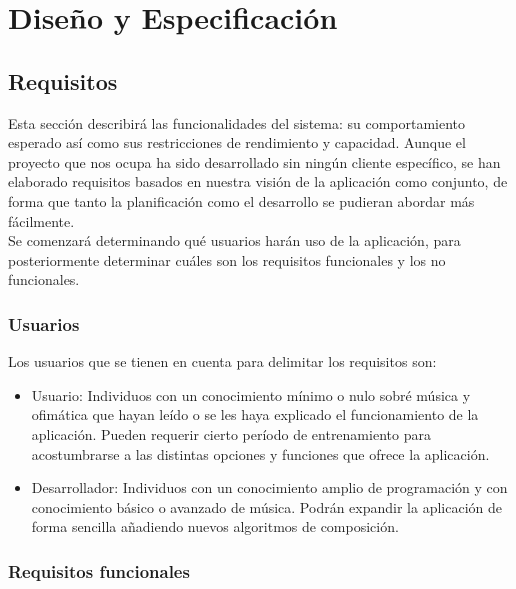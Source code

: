 \chapter{Diseño y Especificación}


\section{Requisitos}
	Esta sección describirá las funcionalidades del sistema: su comportamiento esperado así como sus restricciones de rendimiento y capacidad. Aunque el proyecto que nos ocupa ha sido desarrollado sin ningún cliente específico, se han elaborado requisitos basados en nuestra visión de la aplicación como conjunto, de forma que tanto la planificación como el desarrollo se pudieran abordar más fácilmente.\\
	
	Se comenzará determinando qué usuarios harán uso de la aplicación, para posteriormente determinar cuáles son los requisitos funcionales y los no funcionales.
	
	\subsection{Usuarios}
	
	Los usuarios que se tienen en cuenta para delimitar los requisitos son:
	
	\begin{itemize}
		\item Usuario: Individuos con un conocimiento mínimo o nulo sobré música y ofimática que hayan leído o se les haya explicado el funcionamiento de la aplicación. Pueden requerir cierto período de entrenamiento para acostumbrarse a las distintas opciones y funciones que ofrece la aplicación.
		\item Desarrollador: Individuos con un conocimiento amplio de programación y con conocimiento básico o avanzado de música. Podrán expandir la aplicación de forma sencilla añadiendo nuevos algoritmos de composición.
	\end{itemize}

	\subsection{Requisitos funcionales}
	

